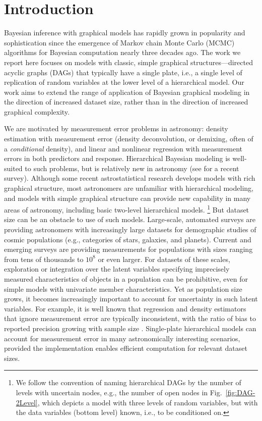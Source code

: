 \section{Introduction}
\label{sec:intro}

Bayesian inference with graphical models has rapidly grown in popularity and sophistication since the emergence of Markov chain Monte Carlo (MCMC) algorithms for Bayesian computation nearly three decades ago.
The work we report here focuses on models with classic, simple graphical structures---directed acyclic graphs (DAGs) that typically have a single plate, i.e., a single level of replication of random variables at the lower level of a hierarchical model.
Our work aims to extend the range of application of Bayesian graphical modeling in the direction of increased dataset size, rather than in the direction of increased graphical complexity.

We are motivated by measurement error problems in astronomy: density estimation with measurement error (density deconvolution, or demixing, often of a \emph{conditional} density), and linear and nonlinear regression with measurement errors in both predictors and response.
Hierarchical Bayesian modeling is well-suited to such problems, but is relatively new in astronomy (see \citealt{loredo2013survey} for a recent survey).
Although some recent astrostatistical research develops models with rich graphical structure, most astronomers are unfamiliar with hierarchical modeling, and models with simple graphical structure can provide new capability in many areas of astronomy, including basic two-level hierarchical models.%
\footnote{We follow the convention of naming hierarchical DAGs by the number of levels with uncertain nodes, e.g., the number of open nodes in Fig.~\ref{fig:DAG-2Level}, which depicts a model with three levels of random variables, but with the data variables (bottom level) known, i.e., to be conditioned on.}
But dataset size can be an obstacle to use of such models.
Large-scale, automated surveys are providing astronomers with increasingly large datasets for demographic studies of cosmic populations (e.g., categories of stars, galaxies, and planets).
Current and emerging surveys are providing measurements for populations with sizes ranging from tens of thousands to $10^8$ or even larger.
For datasets of these scales, exploration or integration over the latent variables specifying imprecisely measured characteristics of objects in a population can be prohibitive, even for simple models with univariate member characteristics.
Yet as population size grows, it becomes increasingly important to account for uncertainty in such latent variables.
For example, it is well known that regression and density estimators that ignore measurement error are typically inconsistent, with the ratio of bias to reported precision growing with sample size \citep{C+06-MsmtErr}.
Single-plate hierarchical models can account for measurement error in many astronomically interesting scenarios, provided the implementation enables efficient computation for relevant dataset sizes.

